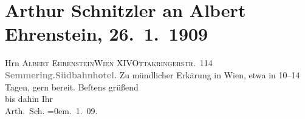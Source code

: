 

         
         \renewcommand{\erwaehntePersonen}{Personen: Albert Ehrenstein}
         \renewcommand{\erwaehnteOrte}{Orte: Ottakringerstraße, Semmering, Südbahnhotel, Wien, XIV., Penzing}
         \renewcommand{\erwaehnteWerke}{}
               \section[Arthur Schnitzler an Albert Ehrenstein, 26. 1. 1909]{ Arthur Schnitzler an Albert Ehrenstein, 26. 1. 1909}\nopagebreak{}\rehead{ }\begin{ledgroupsized}[t]{13cm}\normalsize\beginnumbering{} \toendnotes[C]{\smallbreak\pagebreak[2]} 
\pstart{}{\pb}Hrn \textsc{Albert Ehrenstein}\pend{}\pstart{}\textsc{Wien XIV}\pend{}\pstart{}\textsc{Ottakringerstr. 114}\pend{}{\bigskip}\pstart
           \noindent{}\centering{}\textcolor{gray}{\textbf{{\pb}Semmering.\hspace*{1.5em}Südbahnhotel.}}\pend
           \pstart
           {\pb}Zu mündlicher Erkärung in Wien, etwa in 10–14 Tagen, gern bereit.\pend
           \pstart
           Beſtens grüßend{\\[\baselineskip]}bis dahin Ihr{\\[\baselineskip]}\spacefill\mbox{Arth. Sch.}\pend
           \leftskip=0em{}. 1. 09.\pend
           
         
         \endnumbering{}\end{ledgroupsized}  \newcommand{\dateiname}{L01828}\newcommand{\titel}{Arthur Schnitzler an Albert Ehrenstein, 26. 1. 1909}\newcommand{\editorInnen}{Martin Anton Müller und Gerd-Hermann Susen}
      